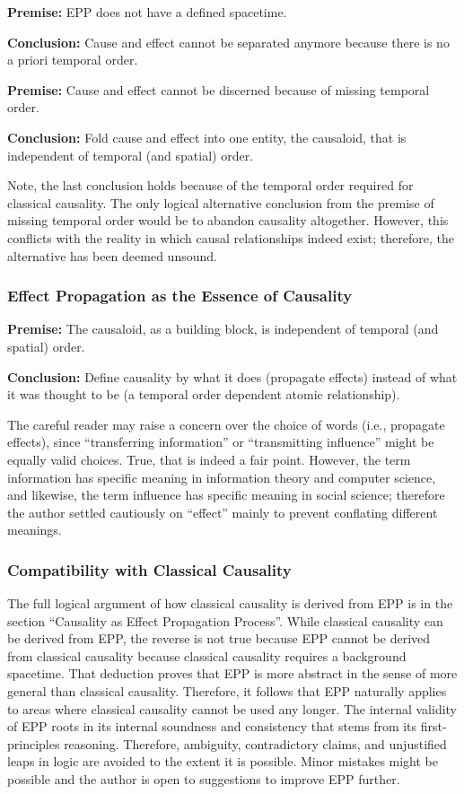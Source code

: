 \documentclass{article}
\begin{document}
\textbf{Premise:} EPP does not have a defined spacetime.

\textbf{Conclusion:} Cause and effect cannot be separated anymore because there is no a priori temporal order.

\textbf{Premise:} Cause and effect cannot be discerned because of missing temporal order.

\textbf{Conclusion:} Fold cause and effect into one entity, the causaloid, that is independent of temporal (and spatial) order.

Note, the last conclusion holds because of the temporal order required for classical causality. The only logical alternative conclusion from the premise of missing temporal order would be to abandon causality altogether. However, this conflicts with the reality in which causal relationships indeed exist; therefore, the alternative has been deemed unsound.

\subsubsection{Effect Propagation as the Essence of Causality}

\textbf{Premise:} The causaloid, as a building block, is independent of temporal (and spatial) order.

\textbf{Conclusion:} Define causality by what it does (propagate effects) instead of what it was thought to be (a temporal order dependent atomic relationship).

The careful reader may raise a concern over the choice of words (i.e., propagate effects), since “transferring information” or “transmitting influence” might be equally valid choices. True, that is indeed a fair point. However, the term information has specific meaning in information theory and computer science, and likewise, the term influence has specific meaning in social science; therefore the author settled cautiously on “effect” mainly to prevent conflating different meanings.

\subsubsection{Compatibility with Classical Causality}

The full logical argument of how classical causality is derived from EPP is in the section “Causality as Effect Propagation Process”.
While classical causality can be derived from EPP, the reverse is not true because EPP cannot be derived from classical causality because classical causality requires a background spacetime. That deduction proves that EPP is more abstract in the sense of more general than classical causality. Therefore, it follows that EPP naturally applies to areas where classical causality cannot be used any longer. The internal validity of EPP roots in its internal soundness and consistency that stems from its first-principles reasoning. Therefore, ambiguity, contradictory claims, and unjustified leaps in logic are avoided to the extent it is possible. Minor mistakes might be possible and the author is open to suggestions  to improve EPP further.
\end{document}
